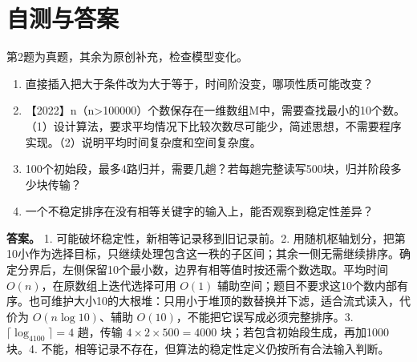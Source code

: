 \section{自测与答案}\label{ds-ch8-check}

第2题为真题，其余为原创补充，检查模型变化。

\begin{enumerate}
\def\labelenumi{\arabic{enumi}.}
\tightlist
\item
  直接插入把大于条件改为大于等于，时间阶没变，哪项性质可能改变？
\item
  【2022】n（n\textgreater100000）个数保存在一维数组M中，需要查找最小的10个数。（1）设计算法，要求平均情况下比较次数尽可能少，简述思想，不需要程序实现。（2）说明平均时间复杂度和空间复杂度。
\item
  100个初始段，最多4路归并，需要几趟？若每趟完整读写500块，归并阶段多少块传输？
\item
  一个不稳定排序在没有相等关键字的输入上，能否观察到稳定性差异？
\end{enumerate}

\textbf{答案。} 1. 可能破坏稳定性，新相等记录移到旧记录前。2. 用随机枢轴划分，把第10小作为选择目标，只继续处理包含这一秩的子区间；其余一侧无需继续排序。确定分界后，左侧保留10个最小数，边界有相等值时按还需个数选取。平均时间 \(O(n)\)，在原数组上迭代选择可用 \(O(1)\) 辅助空间；题目不要求这10个数内部有序。也可维护大小10的大根堆：只用小于堆顶的数替换并下滤，适合流式读入，代价为 \(O(n\log10)\)、辅助 \(O(10)\)，不能把它误写成必须完整排序。3. \(\lceil\log_4100\rceil=4\) 趟，传输 \(4\times2\times500=4000\) 块；若包含初始段生成，再加1000块。4. 不能，相等记录不存在，但算法的稳定性定义仍按所有合法输入判断。
